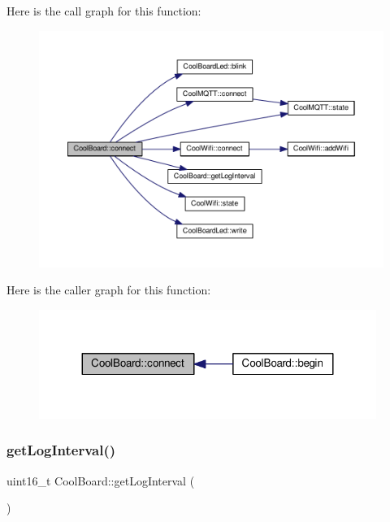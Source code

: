 Here is the call graph for this function\+:
\nopagebreak
\begin{figure}[H]
\begin{center}
\leavevmode
\includegraphics[width=350pt]{classCoolBoard_a519de78b807f8ec6463ff484eb925918_cgraph}
\end{center}
\end{figure}
Here is the caller graph for this function\+:
\nopagebreak
\begin{figure}[H]
\begin{center}
\leavevmode
\includegraphics[width=311pt]{classCoolBoard_a519de78b807f8ec6463ff484eb925918_icgraph}
\end{center}
\end{figure}
\mbox{\label{classCoolBoard_aaa24480b273fc095a1356a589c333781}} 
\subsubsection{\texorpdfstring{get\+Log\+Interval()}{getLogInterval()}}
{\footnotesize\ttfamily uint16\+\_\+t Cool\+Board\+::get\+Log\+Interval (\begin{DoxyParamCaption}{ }\end{DoxyParamCaption})}

